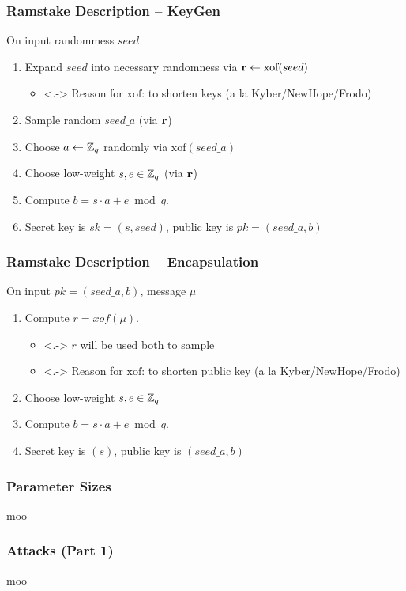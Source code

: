 \documentclass[11pt,t,xcolor=pdftex,svgnames]{beamer}
\newcommand{\xof}{\ensuremath{\text{xof}}}
\begin{document}
\begin{frame}\frametitle{Ramstake Description -- KeyGen}
\onslide<+->
On input randommess $seed$
\begin{enumerate}
\item<+-> Expand $seed$ into necessary randomness via $\vecr \gets
  \xof(seed)$
\begin{itemize}
\smallskip
\item<.-> Reason for $\text{xof}$: to
  shorten keys (a la Kyber/NewHope/Frodo)
\smallskip
\end{itemize}
\item<+-> Sample random $seed\_a$ (via $\mathbf{r}$)
\medskip
\item<+-> Choose $a \gets \mathbb{Z}_q$ randomly via $\text{xof}(seed\_a)$ 
\medskip
\item<+-> Choose \alert{low-weight} $s, e \in \mathbb{Z}_q$ (via $\mathbf{r}$)
\medskip
\item<+-> Compute $b = s\cdot a + e \bmod{q}$. 
\medskip
\item<+-> Secret key is $sk=(s, seed)$, public key is $pk=(seed\_a, b)$
\end{enumerate}
\end{frame}

\begin{frame}\frametitle{Ramstake Description -- Encapsulation}
\onslide<+->
On input $pk=(seed\_a,b)$, message $\mu$
\begin{enumerate}
\item<+-> Compute $r=xof(\mu)$.
\begin{itemize}
\item<.-> $r$ will be used both to sample 
\medskip
\item<.-> Reason for $\text{xof}$: to
  shorten public key (a la Kyber/NewHope/Frodo)
\end{itemize}
\medskip
\item<+-> Choose \alert{low-weight} $s, e \in \mathbb{Z}_q$
\medskip
\item<+-> Compute $b = s\cdot a + e \bmod{q}$. 
\medskip
\item<+-> Secret key is $(s)$, public key is $(seed\_a, b)$
\end{enumerate}
\end{frame}

\begin{frame}\frametitle{Parameter Sizes}
moo
\end{frame}

\begin{frame}\frametitle{Attacks (Part 1)}
moo
\end{frame}
\end{document}
